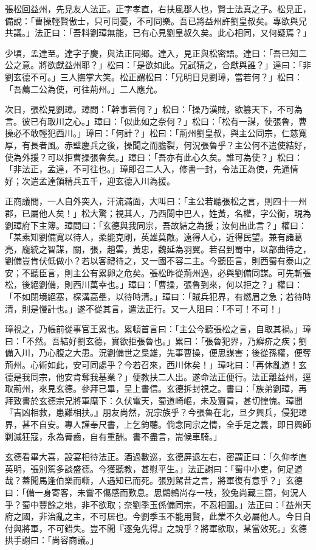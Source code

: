 張松回益州，先見友人法正。正字孝直，右扶風郡人也，賢士法真之子。松見正，備說：「曹操輕賢傲士，只可同憂，不可同樂。吾已將益州許劉皇叔矣。專欲與兄共議。」法正曰：「吾料劉璋無能，已有心見劉皇叔久矣。此心相同，又何疑焉？」

少頃，孟達至。達字子慶，與法正同鄉。達入，見正與松密語。達曰：「吾已知二公之意。將欲獻益州耶？」松曰：「是欲如此。兄試猜之，合獻與誰？」達曰：「非劉玄德不可。」三人撫掌大笑。松正謂松曰：「兄明日見劉璋，當若何？」松曰：「吾薦二公為使，可往荊州。」二人應允。

次日，張松見劉璋。璋問：「幹事若何？」松曰：「操乃漢賊，欲篡天下，不可為言。彼已有取川之心。」璋曰：「似此如之奈何？」松曰：「松有一謀，使張魯，曹操必不敢輕犯西川。」璋曰：「何計？」松曰：「荊州劉皇叔，與主公同宗，仁慈寬厚，有長者風。赤壁鏖兵之後，操聞之而膽裂，何況張魯乎？主公何不遣使結好，使為外援？可以拒曹操張魯矣。」璋曰：「吾亦有此心久矣。誰可為使？」松曰：「非法正，孟達，不可往也。」璋即召二人入，修書一封，令法正為使，先通情好；次遣孟達領精兵五千，迎玄德入川為援。

正商議間，一人自外突入，汗流滿面，大叫曰：「主公若聽張松之言，則四十一州郡，已屬他人矣！」松大驚；視其人，乃西閬中巴人，姓黃，名權，字公衡，現為劉璋府下主簿。璋問曰：「玄德與我同宗，吾故結之為援；汝何出此言？」權曰：「某素知劉備寬以待人，柔能克剛，英雄莫敵。遠得人心，近得民望。兼有諸葛亮，龐統之智謀，關，張，趙雲，黃忠，魏延為羽翼。若召到蜀中，以部曲待之，劉備豈肯伏低做小？若以客禮待之，又一國不容二主。今聽臣言，則西蜀有泰山之安；不聽臣言，則主公有累卵之危矣。張松昨從荊州過，必與劉備同謀。可先斬張松，後絕劉備，則西川萬幸也。」璋曰：「曹操，張魯到來，何以拒之？」權曰：「不如閉境絕塞，棎溝高壘，以待時清。」璋曰：「賊兵犯界，有燃眉之急；若待時清，則是慢計也。」遂不從其言，遣法正行。又一人阻曰：「不可！不可！」

璋視之，乃帳前從事官王累也。累頓首言曰：「主公今聽張松之言，自取其禍。」璋曰：「不然。吾結好劉玄德，實欲拒張魯也。」累曰：「張魯犯界，乃癬疥之疾；劉備入川，乃心腹之大患。況劉備世之梟雄，先事曹操，便思謀害；後從孫權，便奪荊州。心術如此，安可同處乎？今若召來，西川休矣！」璋叱曰：「再休亂道！玄德是我同宗，他安肯奪我基業？」便教扶二人出。遂命法正便行。法正離益州，逕取荊州，來見玄德。參拜已畢，呈上書信。玄德拆封視之。書曰：「族弟劉璋，再拜致書於玄德宗兄將軍麾下：久伏電天，蜀道崎嶇，未及齎貢，甚切惶愧。璋聞『吉凶相救，患難相扶。』朋友尚然，況宗族乎？今張魯在北，旦夕興兵，侵犯璋界，甚不自安。專人謹奉尺書，上乞鈞聽。倘念同宗之情，全手足之義，即日興師剿滅狂寇，永為脣齒，自有重酬。書不盡言，耑候車騎。」

玄德看畢大喜，設宴相待法正。酒過數巡，玄德屏退左右，密謂正曰：「久仰孝直英明，張別駕多談盛德。今獲聽教，甚慰平生。」法正謝曰：「蜀中小吏，何足道哉？蓋聞馬逢伯樂而嘶，人遇知已而死。張別駕昔之言，將軍復有意乎？」玄德曰：「備一身寄客，未嘗不傷感而歎息。思鷦鷯尚存一枝，狡兔尚藏三窟，何況人乎？蜀中豐餘之地，非不欲取；奈劉季玉係備同宗，不忍相圖。」法正曰：「益州天府之國，非治亂之主，不可居也。今劉季玉不能用賢，此業不久必屬他人。今日自付與將軍，不可錯失。豈不聞『逐兔先得』之說乎？將軍欲取，某當效死。」玄德拱手謝曰：「尚容商議。」

